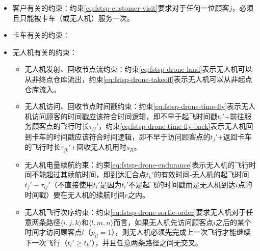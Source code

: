 \begin{itemize}
    \item \colorbox{shallow-green}{客户有关的约束：}约束\ref{eq:fstsp-customer-visit}要求对于任何一位顾客$j$，必须且只能被卡车（或无人机）服务一次。
    \item \colorbox{shallow-purple}{卡车有关的约束：}
    \item \colorbox{shallow-red}{无人机有关的约束：}
    \begin{itemize}
        \item 无人机发射、回收节点流约束：约束\ref{eq:fstsp-drone-land}表示无人机可以从非终点仓库流出，约束\ref{eq:fstsp-drone-takeoff}表示无人机可以从非起点仓库流入。
        \item 无人机访问、回收节点时间戳约束：约束\ref{eq:fstsp-drone-time-fly}表示无人机访问顾客的时间戳应该符合时间逻辑，即不早于起飞时间戳$t_i'$+前往服务顾客点的飞行时长$\tau_{ij}'$，约束\ref{eq:fstsp-drone-time-fly-back}表示无人机回到卡车的时间戳应该符合时间逻辑，即不早于访问顾客点的$t_j'$+返回卡车的飞行时长$\tau_{jk}'$+回收无人机用时$s_R$。
        \item 无人机电量续航约束：约束\ref{eq:fstsp-drone-endurance}表示无人机的飞行时间不能超过其续航时间，即到达汇合点$t_k'$的有效时间-无人机的起飞时间$t_j'-\tau_{ij}'$（不直接使用$t_i'$是因为$t_i'$不是起飞的时间戳而是无人机到达$i$点的时间戳）要在无人机的续航时间$e$之内。
        \item 无人机飞行次序约束：约束\ref{eq:fstsp-drone-sortie-order}要求无人机对于任意两条路径$\langle i,j,k \rangle$和$\langle l,m,n \rangle$而言，如果无人机先访问顾客点$i$之后的某个时间才访问顾客点$l$（$p_{il}=1$），则无人机必须先完成上一次飞行才能继续下一次飞行（$t_l'\geq t_k'$），并且任意两条路径之间无交叉。

\end{itemize}
\end{itemize}
